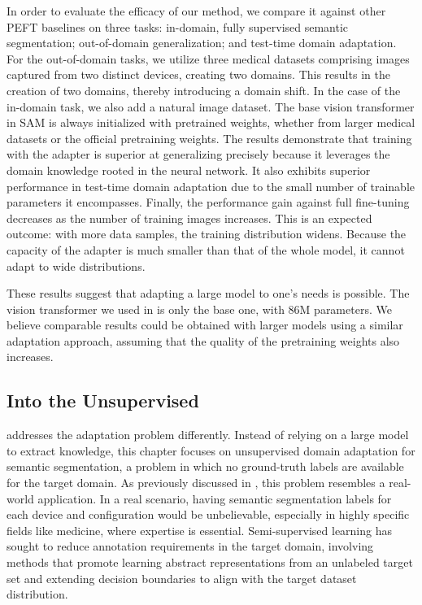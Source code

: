 In order to evaluate the efficacy of our method, we compare it against other PEFT baselines on three tasks: in-domain, fully supervised semantic segmentation; out-of-domain generalization; and test-time domain adaptation. For the out-of-domain tasks, we utilize three medical datasets comprising images captured from two distinct devices, creating two domains. This results in the creation of two domains, thereby introducing a domain shift. In the case of the in-domain task, we also add a natural image dataset. The base vision transformer in SAM is always initialized with pretrained weights, whether from larger medical datasets or the official pretraining weights. The results demonstrate that training with the adapter is superior at generalizing precisely because it leverages the domain knowledge rooted in the neural network. It also exhibits superior performance in test-time domain adaptation due to the small number of trainable parameters it encompasses. Finally, the performance gain against full fine-tuning decreases as the number of training images increases. This is an expected outcome: with more data samples, the training distribution widens. Because the capacity of the adapter is much smaller than that of the whole model, it cannot adapt to wide distributions.

These results suggest that adapting a large model to one's needs is possible. The vision transformer we used in  is only the base one, with 86M parameters. We believe comparable results could be obtained with larger models using a similar adaptation approach, assuming that the quality of the pretraining weights also increases. 

\subsection{Into the Unsupervised}
 addresses the adaptation problem differently. Instead of relying on a large model to extract knowledge, this chapter focuses on unsupervised domain adaptation for semantic segmentation, a problem in which no ground-truth labels are available for the target domain. As previously discussed in , this problem resembles a real-world application. In a real scenario, having semantic segmentation labels for each device and configuration would be unbelievable, especially in highly specific fields like medicine, where expertise is essential. Semi-supervised learning has sought to reduce annotation requirements in the target domain, involving methods that promote learning abstract representations from an unlabeled target set and extending decision boundaries to align with the target dataset distribution.


